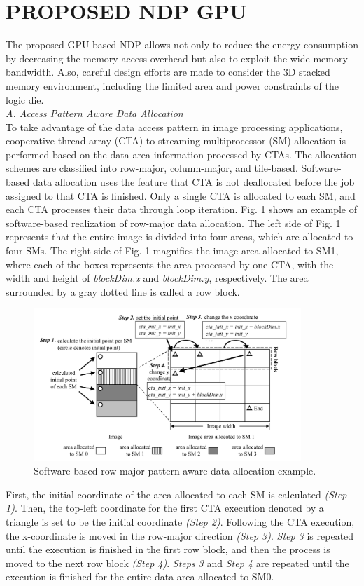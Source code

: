 \documentclass[onecolumn]{article}
\begin{document}
\section{PROPOSED NDP GPU}
The proposed GPU-based NDP allows not only to reduce the energy consumption by decreasing the memory access overhead but also to exploit the wide memory bandwidth. Also, careful design efforts are made to consider the 3D stacked memory environment, including the limited area and power constraints of the logic die.
\\
\textit{A. Access Pattern Aware Data Allocation}\\
To take advantage of the data access pattern in image processing applications, cooperative thread array (CTA)-to-streaming multiprocessor (SM) allocation is performed based on the data area information processed by CTAs. The allocation schemes are classified into row-major, column-major, and tile-based. Software-based data allocation uses the feature that CTA is not deallocated before the job assigned to that CTA is finished. Only a single CTA is allocated to each SM, and each CTA processes their data through loop iteration. Fig. 1 shows an example of software-based realization of row-major data allocation. The left side of Fig. 1 represents that the entire image is divided into four areas, which are allocated to four SMs. The right side of Fig. 1 magnifies the image area allocated to SM1, where each of the boxes represents the area processed by one CTA, with the width and height of \textit{blockDim.x} and \textit{blockDim.y}, respectively. The area surrounded by a gray dotted line is called a row block. 


\begin{figure}[H]
	\centering
	\includegraphics[width=0.9\textwidth]{Figure-1.png}
	\caption{Software-based row major pattern aware data allocation example.}
	\label{fig:row_major_pattern}
\end{figure}
First, the initial coordinate of the area allocated to each SM is calculated \textit{(Step 1)}. Then, the top-left coordinate for the first CTA execution denoted by a triangle is set to be the initial coordinate \textit{(Step 2)}. Following the CTA execution, the x-coordinate is moved in the row-major direction \textit{(Step 3)}. \textit{Step 3} is repeated until the execution is finished in the first row block, and then the process is moved to the next row block \textit{(Step 4)}. \textit{Steps 3} and \textit{Step 4} are repeated until the execution is finished for the entire data area allocated to SM0.\\
\end{document}
